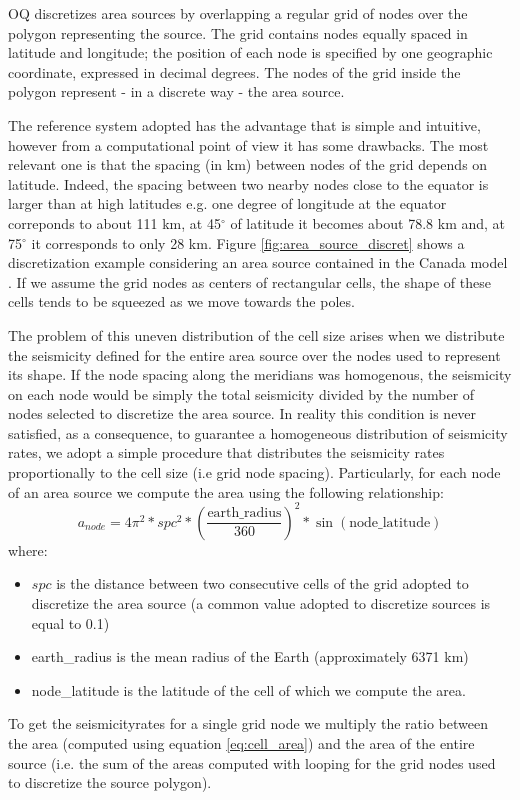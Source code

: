 %
OQ discretizes area sources by overlapping a regular grid of nodes
over the polygon representing the source. The grid contains nodes 
equally spaced in latitude and longitude; the position of each node
is specified by one geographic coordinate, expressed in decimal degrees. 
The nodes of the grid inside the polygon represent - in a discrete way - 
the area source.

The reference system adopted has the advantage that is simple and 
intuitive, however from a computational point of view it has some 
drawbacks. The most relevant one is that the spacing (in km) between 
nodes of the grid depends on latitude. 
%
Indeed, the spacing between two nearby nodes close to the equator is 
larger than at high latitudes e.g. one degree of longitude at the equator 
correponds to about 111 km, at 45$^\circ$ of latitude it becomes 
about 78.8 km and, at 75$^\circ$ it corresponds to only 28 km. 
%
Figure \ref{fig:area_source_discret} shows a discretization example 
considering an area source contained in the Canada model \citep{adams2003}. 
%
If we assume the grid nodes as centers of rectangular cells, the shape
of these cells tends to be squeezed as we move towards the poles.

The problem of this uneven distribution of the cell size arises when we 
distribute the seismicity defined for the entire area source over the 
nodes used to represent its shape. If the node spacing along the 
meridians was homogenous, the seismicity on each node would be 
simply the total seismicity divided by the number of nodes selected 
to discretize the area source.
%
In reality this condition is never satisfied, as a consequence, to 
guarantee a homogeneous distribution of seismicity rates,
we adopt a simple procedure that distributes the seismicity rates 
proportionally to the cell size (i.e grid node spacing).
%
Particularly, for each node of an area source we compute the area using
the following relationship:
\begin{equation}
	a_{node} = 4\pi^2 * spc^2 *  
 	\left(\frac{\text{earth\_radius}}{360}\right)^2 * 
 	\sin(\text{node\_latitude})
\label{eq:cell_area}
\end{equation}
where:
\begin{itemize}
\item $spc$ is the distance between two consecutive cells 
	of the grid adopted to discretize the area source (a common value 
	adopted to discretize sources is equal to 0.1)
\item earth\_radius is the mean radius of the Earth (approximately 
	6371 km) 
\item node\_latitude is the latitude of the cell of which we compute
	the area.
\end{itemize}
%
To get the \glspl{seismicityrate} for a single grid node we multiply the 
ratio between the area (computed using equation \ref{eq:cell_area}) and 
the area of the entire source (i.e. the sum of the areas computed 
with looping for the grid nodes used to discretize the source polygon).
%

